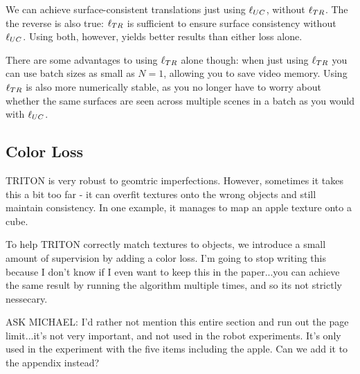 \documentclass{article}
\begin{document}
	We can achieve surface-consistent translations just using $\ell_{UC}$, without $\ell_{TR}$.
	The the reverse is also true: $\ell_{TR}$ is sufficient to ensure surface consistency without $\ell_{UC}$.
	Using both, however, yields better results than either loss alone. 
	
	There are some advantages to using $\ell_{TR}$ alone though: when just using $\ell_{TR}$ you can use batch sizes as small as $N=1$, allowing you to save video memory. 
	Using $\ell_{TR}$ is also more numerically stable, as you no longer have to worry about whether the same surfaces are seen across multiple scenes in a batch as you would with $\ell_{UC}$.



\subsection{Color Loss}

	TRITON is very robust to geomtric imperfections. However, sometimes it takes this a bit too far - it can overfit textures onto the wrong objects and still maintain consistency.
	In one example, it manages to map an apple texture onto a cube. 

	To help TRITON correctly match textures to objects, we introduce a small amount of supervision by adding a color loss. I'm going to stop writing this because I don't know if I even want to keep this in the paper...you can achieve the same result by running the algorithm multiple times, and so its not strictly nessecary.

	ASK MICHAEL: I'd rather not mention this entire section and run out the page limit...it's not very important, and not used in the robot experiments. It's only used in the experiment with the five items including the apple. Can we add it to the appendix instead?
\end{document}
